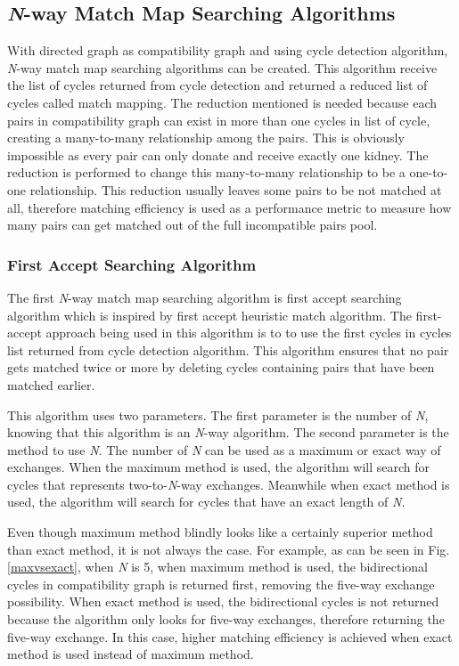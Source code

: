 \documentclass[conference]{IEEEtran}
\begin{document}
\subsection{\textit{N}-way Match Map Searching Algorithms}
With directed graph as compatibility graph and using cycle detection algorithm, \textit{N}-way match map searching algorithms
can be created. This algorithm receive the list of cycles returned from cycle detection and returned a reduced list of cycles
called match mapping. The reduction mentioned is needed because each pairs in compatibility graph can exist in more than one cycles
in list of cycle, creating a many-to-many relationship among the pairs. This is obviously impossible as every pair can only donate
and receive exactly one kidney. The reduction is performed to change this many-to-many relationship to be a one-to-one relationship. This
reduction usually leaves some pairs to be not matched at all, therefore matching efficiency is used as a performance metric to
measure how many pairs can get matched out of the full incompatible pairs pool.  

\subsubsection{First Accept Searching Algorithm}
The first \textit{N}-way match map searching algorithm is first accept searching algorithm which is inspired by first accept
heuristic match algorithm. The first-accept approach being used in this algorithm is to to use the first cycles in cycles list
returned from cycle detection algorithm. This algorithm ensures that no pair gets matched twice or more by deleting cycles
containing pairs that have been matched earlier.

This algorithm uses two parameters. The first parameter is the number of \textit{N}, knowing that this algorithm is an \textit{N}-way
algorithm. The second parameter is the method to use \textit{N}. The number of \textit{N} can be used as a maximum or exact way of exchanges.
When the maximum method is used, the algorithm will search for cycles that represents two-to-\textit{N}-way exchanges. Meanwhile when exact
method is used, the algorithm will search for cycles that have an exact length of \textit{N}.

Even though maximum method blindly looks like a certainly superior method than exact method, it is not always the case. For example, as can be
seen in Fig. \ref{maxvsexact}, when \textit{N} is 5, when maximum method is used, the bidirectional cycles in compatibility graph is
returned first, removing the five-way exchange possibility. When exact method is used, the bidirectional cycles is not returned because
the algorithm only looks for five-way exchanges, therefore returning the five-way exchange. In this case, higher matching efficiency
is achieved when exact method is used instead of maximum method.
\end{document}
